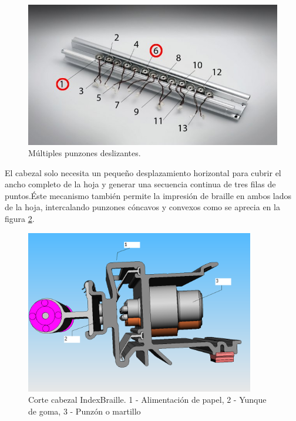 \begin{figure}[htp]
\centering
\includegraphics[width=12cm]{./img/embosser_index_multiple_hammers.png}
\caption{M\'ultiples punzones deslizantes.}
\label{fig:embosser_index_multiple_hammers}
\end{figure}

El cabezal solo necesita un peque\~no desplazamiento horizontal para cubrir el
ancho completo de la hoja y generar una secuencia continua de tres filas de
puntos.\'Este mecanismo tambi\'en permite la impresi\'on de braille en ambos
lados de la hoja, intercalando punzones c\'oncavos y convexos como se aprecia
en la figura \ref{fig:embosser_index_cut_hammers}.

\begin{figure}[htp]
\centering
\includegraphics[width=10cm]{./img/embosser_index_cut_hammers.png}
\caption{Corte cabezal IndexBraille. 1 - Alimentaci\'on de papel, 2 - Yunque de
goma, 3 - Punz\'on o martillo}
\label{fig:embosser_index_cut_hammers}
\end{figure}

